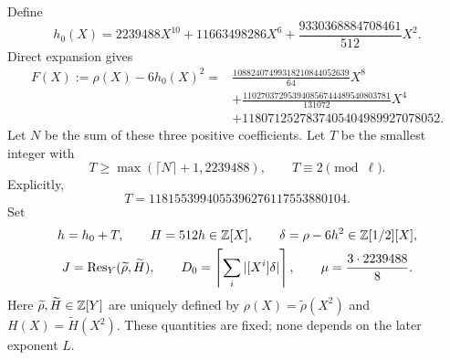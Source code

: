 \documentclass[11pt]{article}
\theoremstyle{remark}\newtheorem{remark}[theorem]{Remark}
\begin{document}
Define
\begin{equation}\label{eq:h0}
 h_0(X)=2239488X^{10}+11663498286X^6
              +\frac{9330368884708461}{512}X^2.
\end{equation}
Direct expansion gives
\begin{equation}\label{eq:F}
 \begin{split}
 F(X):=\rho(X)-6h_0(X)^2
  ={}&\frac{10882407499318210844052639}{64}X^8\\
    &+\frac{110270372953940856744489540803781}{131072}X^4\\
    &+1180712527837405404989927078052.
 \end{split}
\end{equation}
Let $N$ be the sum of these three positive coefficients.  Let $T$
be the smallest integer with
\[
 T\ge\max(\lceil N\rceil+1,2239488),\qquad T\equiv2\pmod\ell.
\]
Explicitly,
\[
                 T=1181553994055396276117553880104.
\]
Set
\begin{equation}\label{eq:fixed-denominator}
 \begin{gathered}
 h=h_0+T,\qquad H=512h\in\mathbb Z[X],\qquad
 \delta=\rho-6h^2\in\mathbb Z[1/2][X],\\
 J=\operatorname{Res}_Y(\widetilde\rho,\widetilde H),\qquad
 D_0=\left\lceil\sum_i|[X^i]\delta|\right\rceil,\qquad
 \mu=\frac{3\cdot2239488}{8}.
 \end{gathered}
\end{equation}
Here $\widetilde\rho,\widetilde H\in\mathbb Z[Y]$ are uniquely defined by
$\rho(X)=\widetilde\rho(X^2)$ and $H(X)=\widetilde H(X^2)$.
These quantities are fixed; none depends on the later exponent $L$.
\end{document}
